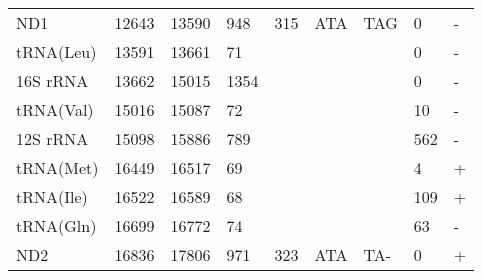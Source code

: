 \documentclass[../DISSERTACAO_MAIN.tex]{subfiles}
\begin{document}
\begin{longtable}{llllllllllllllllllllll}
			ND1          & 12643          & \multicolumn{2}{l}{13590} & \multicolumn{2}{l}{948}        & \multicolumn{3}{l}{315}                       & \multicolumn{3}{l}{ATA}           & \multicolumn{3}{l}{TAG}   & \multicolumn{3}{l}{0}           & \multicolumn{4}{l}{-}                  \\
			tRNA(Leu)    & 13591          & \multicolumn{2}{l}{13661} & \multicolumn{2}{l}{71}         & \multicolumn{3}{l}{}                          & \multicolumn{3}{l}{}              & \multicolumn{3}{l}{}      & \multicolumn{3}{l}{0}           & \multicolumn{4}{l}{-}                  \\
			16S 				rRNA & 13662          & \multicolumn{2}{l}{15015} & \multicolumn{2}{l}{1354}       & \multicolumn{3}{l}{}                          & \multicolumn{3}{l}{}              & \multicolumn{3}{l}{}      & \multicolumn{3}{l}{0}           & \multicolumn{4}{l}{-}                  \\
			tRNA(Val)    & 15016          & \multicolumn{2}{l}{15087} & \multicolumn{2}{l}{72}         & \multicolumn{3}{l}{}                          & \multicolumn{3}{l}{}              & \multicolumn{3}{l}{}      & \multicolumn{3}{l}{10}          & \multicolumn{4}{l}{-}                  \\
			12S 				rRNA & 15098          & \multicolumn{2}{l}{15886} & \multicolumn{2}{l}{789}        & \multicolumn{3}{l}{}                          & \multicolumn{3}{l}{}              & \multicolumn{3}{l}{}      & \multicolumn{3}{l}{562}         & \multicolumn{4}{l}{-}                  \\
			tRNA(Met)    & 16449          & \multicolumn{2}{l}{16517} & \multicolumn{2}{l}{69}         & \multicolumn{3}{l}{}                          & \multicolumn{3}{l}{}              & \multicolumn{3}{l}{}      & \multicolumn{3}{l}{4}           & \multicolumn{4}{l}{+}                  \\
			tRNA(Ile)    & 16522          & \multicolumn{2}{l}{16589} & \multicolumn{2}{l}{68}         & \multicolumn{3}{l}{}                          & \multicolumn{3}{l}{}              & \multicolumn{3}{l}{}      & \multicolumn{3}{l}{109}         & \multicolumn{4}{l}{+}                  \\
			tRNA(Gln)    & 16699          & \multicolumn{2}{l}{16772} & \multicolumn{2}{l}{74}         & \multicolumn{3}{l}{}                          & \multicolumn{3}{l}{}              & \multicolumn{3}{l}{}      & \multicolumn{3}{l}{63}          & \multicolumn{4}{l}{-}                  \\
			ND2          & 16836          & \multicolumn{2}{l}{17806} & \multicolumn{2}{l}{971}        & \multicolumn{3}{l}{323}                       & \multicolumn{3}{l}{ATA}           & \multicolumn{3}{l}{TA-}   & \multicolumn{3}{l}{0}           & \multicolumn{4}{l}{+}                  \\

\end{longtable}
\end{document}
